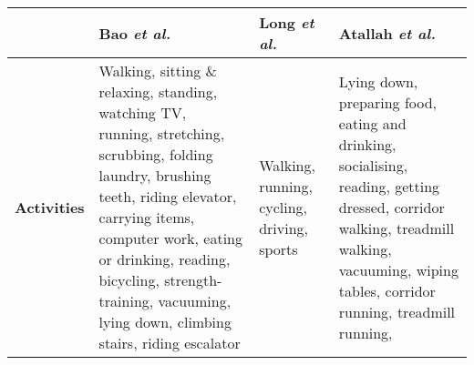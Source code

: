     \begin{table}[p]
      {\tabulinesep=1.2mm
      \begin{tabu} to 
        \hline
          & \textbf{Bao \emph{et al.} \cite{bao2004activity}}
          & \textbf{Long \emph{et al.} \cite{long2009single}}
          & \textbf{Atallah \emph{et al.} \cite{atallah2010sensor}} \\
        \hline
          \textbf{Activities}
          & Walking, \newline sitting \& relaxing, \newline standing, \newline watching TV,
              \newline running, \newline stretching, \newline scrubbing, \newline folding laundry, 
              \newline brushing teeth, \newline riding elevator, \newline carrying items, 
              \newline computer work, \newline eating or drinking, \newline reading, 
              \newline bicycling, \newline strength-training, \newline vacuuming, 
              \newline lying down, \newline climbing stairs, \newline riding escalator
          & Walking, \newline running, \newline cycling, \newline driving, \newline sports
          & Lying down, \newline preparing food, \newline eating and drinking, 
              \newline socialising, \newline reading, \newline getting dressed, 
              \newline corridor walking, \newline treadmill walking, \newline vacuuming, 
              \newline wiping tables, \newline corridor running, \newline treadmill running, 

\end{tabu}}
\end{table}
